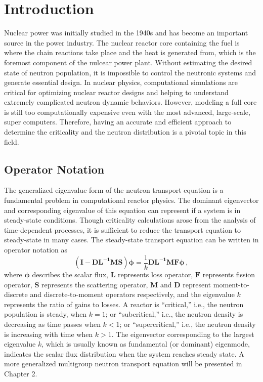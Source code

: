 \cleardoublepage

\chapter{Introduction}
\label{chapter:intro}
Nuclear power was initially studied in the 1940s and has become an important source in the power industry.
The nuclear reactor core containing the fuel is where the chain reactions take place and the heat is generated from, which is the foremost component of the nulcear power plant. 
Without estimating the desired state of neutron population, it is impossible to control the neutronic systems and generate essential design. 
In nuclear physics, computational simulations are critical for optimizing nuclear reactor designs and helping to understand extremely complicated neutron dynamic behaviors.
However, modeling a full core is still too computationally expensive even with the most advanced, large-scale, super computers. 
Therefore, having an accurate and efficient approach to determine the criticality and the neutron distribution is a pivotal topic in this field.

\section{Operator Notation}
The generalized eigenvalue form of the neutron transport equation is a fundamental problem in computational reactor physics.
The dominant eigenvector and corresponding eigenvalue of this equation can represent if a system is in steady-state conditions.
Though criticality calculations arose from the analysis of time-dependent processes, it is sufficient to reduce the transport equation to steady-state in many cases. 
The steady-state transport equation can be written in operator notation as
\begin{equation}
 \mathbf{(I - DL^{-1}MS)} \mathbf{\phi} = \frac{1}{k} \mathbf{DL^{-1}MF} \mathbf{\phi}  \, ,
 \label{eq:keig}
\end{equation}
where $\mathbf{\phi} $ describes the scalar flux, $\mathbf{L}$ represents loss operator,  $\mathbf{F}$ represents fission operator, $\mathbf{S}$ represents the scattering operator, $\mathbf{M}$ and $\mathbf{D}$ represent moment-to-discrete and discrete-to-moment operators respectively, and the eigenvalue $k$ represents the ratio of gains to losses.
A reactor is ``critical,'' i.e., the neutron population is steady, when $k = 1$; or ``subcritical,'' i.e., the neutron density is decreasing as time passes when $k < 1$; or ``supercritical,'' i.e., the neutron density is increasing with time when $k>1$.
The eigenvector corresponding to the largest eigenvalue $k$, which is usually known as fundamental (or dominant) eigenmode, indicates the scalar flux distribution when the system reaches steady state.
A more generalized multigroup neutron transport equation will be presented in Chapter 2.

